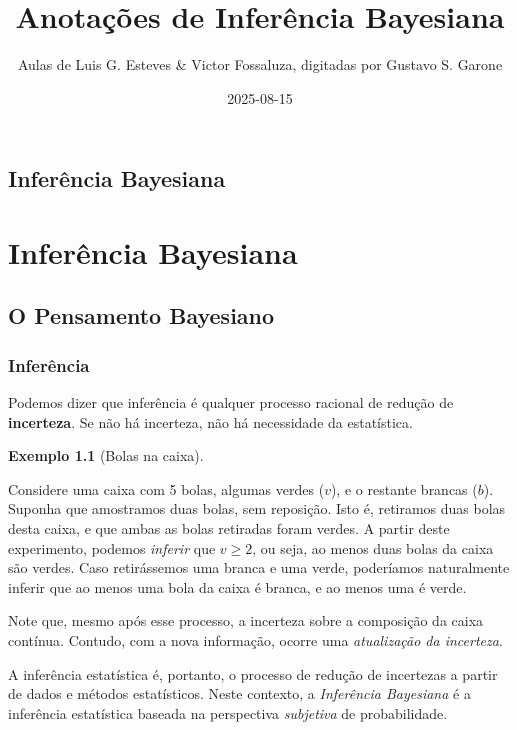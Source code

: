 \documentclass[
  portuguese,
  letterpaper,
  DIV=11,
  numbers=noendperiod]{scrreport}
\title{Anotações de Inferência Bayesiana}
\author{Aulas de Luis G. Esteves \& Victor Fossaluza, digitadas por
Gustavo S. Garone}
\date{2025-08-15}
\renewcommand*\contentsname{Índice}
\newcommand\contentsname{Índice}
\theoremstyle{definition}
\theoremstyle{definition}
\newtheorem{example}{Exemplo}[chapter]
\theoremstyle{plain}
\theoremstyle{remark}
\begin{document}
\maketitle

\renewcommand*\contentsname{Índice}
{
\hypersetup{linkcolor=}
\setcounter{tocdepth}{2}
\tableofcontents
}


\chapter{Inferência Bayesiana}\label{inferuxeancia-bayesiana}

\part{Inferência Bayesiana}

\chapter{O Pensamento Bayesiano}\label{o-pensamento-bayesiano}

\section{Inferência}\label{inferuxeancia}

Podemos dizer que inferência é qualquer processo racional de redução de
\textbf{incerteza}. Se não há incerteza, não há necessidade da
estatística.

\begin{example}[Bolas na
caixa]\protect\hypertarget{exm-urna}{}\label{exm-urna}

Considere uma caixa com 5 bolas, algumas verdes (\(v\)), e o restante
brancas (\(b\)). Suponha que amostramos duas bolas, sem reposição. Isto
é, retiramos duas bolas desta caixa, e que ambas as bolas retiradas
foram verdes. A partir deste experimento, podemos \emph{inferir} que
\(v \geq 2\), ou seja, ao menos duas bolas da caixa são verdes. Caso
retirássemos uma branca e uma verde, poderíamos naturalmente inferir que
ao menos uma bola da caixa é branca, e ao menos uma é verde.

\end{example}

Note que, mesmo após esse processo, a incerteza sobre a composição da
caixa contínua. Contudo, com a nova informação, ocorre uma
\emph{atualização da incerteza}.

A inferência estatística é, portanto, o processo de redução de
incertezas a partir de dados e métodos estatísticos. Neste contexto, a
\emph{Inferência Bayesiana} é a inferência estatística baseada na
perspectiva \emph{subjetiva} de probabilidade.
\end{document}
